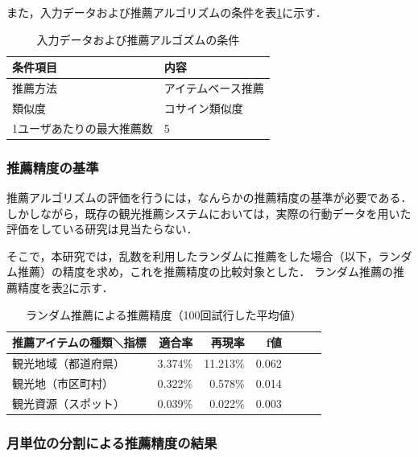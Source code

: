 \documentclass{jsarticle}
\begin{document}
また，入力データおよび推薦アルゴリズムの条件を表\ref{recommendation_condition}に示す．

\begin{table}[ht!]
\small
\caption{入力データおよび推薦アルゴズムの条件}
\begin{center}
\begin{tabular}{ll}
\label{recommendation_condition}
条件項目    & 内容 \\ \hline
推薦方法    & アイテムベース推薦 \\
類似度      & コサイン類似度 \\
1ユーザあたりの最大推薦数 & 5 \\
\end{tabular}
\end{center}
\end{table}



\subsubsection{推薦精度の基準}

推薦アルゴリズムの評価を行うには，なんらかの推薦精度の基準が必要である．しかしながら，既存の観光推薦システムにおいては，実際の行動データを用いた評価をしている研究は見当たらない．

そこで，本研究では，乱数を利用したランダムに推薦をした場合（以下，ランダム推薦）の精度を求め，これを推薦精度の比較対象とした．
ランダム推薦の推薦精度を表\ref{result_random}に示す．

\begin{table}[ht!]
\small
\caption{ランダム推薦による推薦精度（100回試行した平均値）}
\begin{center}
\begin{tabular}{lrrrrrr}
\label{result_random}
推薦アイテムの種類＼指標    & 適合率 & 再現率 & f値 \\ \hline
観光地域（都道府県）        & 3.374\% & 11.213\% & 0.062 \\
観光地（市区町村）          & 0.322\% &  0.578\% & 0.014 \\
観光資源（スポット）        & 0.039\% &  0.022\% & 0.003 \\
\end{tabular}
\end{center}
\end{table}

\subsubsection{月単位の分割による推薦精度の結果}
\end{document}
